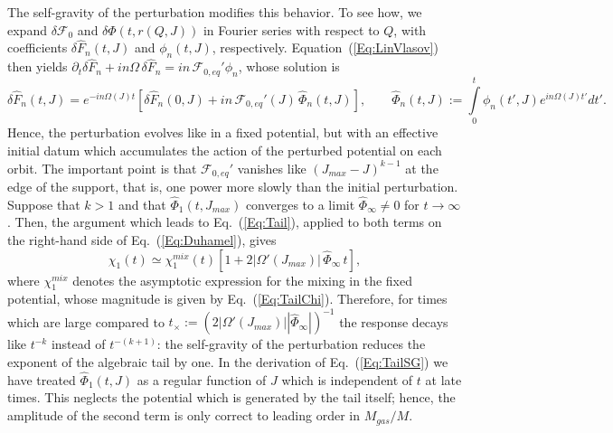 The self-gravity of the perturbation modifies this behavior. To see how, we expand $\delta\mathcal{F}_0$ and $\delta\Phi(t,r(Q,J))$ in Fourier series with respect to $Q$, with coefficients $\delta\hat{F}_n(t,J)$ and $\phi_n(t,J)$, respectively. Equation~(\ref{Eq:LinVlasov}) then yields $\partial_t\delta\hat{F}_n + in\Omega\,\delta\hat{F}_n = in\,\mathcal{F}_{0,eq}'\phi_n$, whose solution is
\begin{equation}
\delta\hat{F}_n(t,J) = e^{-in\Omega(J)t}\left[ \delta\hat{F}_n(0,J) + in\,\mathcal{F}_{0,eq}'(J)\,\hat{\Phi}_n(t,J) \right],\qquad
\hat{\Phi}_n(t,J) := \int\limits_0^t \phi_n(t',J) e^{in\Omega(J)t'} dt'.
\label{Eq:Duhamel}
\end{equation}
Hence, the perturbation evolves like in a fixed potential, but with an effective initial datum which accumulates the action of the perturbed potential on each orbit. The important point is that $\mathcal{F}_{0,eq}'$ vanishes like $(J_{max} - J)^{k-1}$ at the edge of the support, that is, one power more slowly than the initial perturbation. Suppose that $k > 1$ and that $\hat{\Phi}_1(t,J_{max})$ converges to a limit $\hat{\Phi}_\infty\neq 0$ for $t\to \infty$. Then, the argument which leads to Eq.~(\ref{Eq:Tail}), applied to both terms on the right-hand side of Eq.~(\ref{Eq:Duhamel}), gives
\begin{equation}
\chi_1(t)\simeq \chi_1^{mix}(t)\left[ 1 + 2|\Omega'(J_{max})|\,\hat{\Phi}_\infty\, t \right],
\label{Eq:TailSG}
\end{equation}
where $\chi_1^{mix}$ denotes the asymptotic expression for the mixing in the fixed potential, whose magnitude is given by Eq.~(\ref{Eq:TailChi}). Therefore, for times which are large compared to $t_\times := (2|\Omega'(J_{max})||\hat{\Phi}_\infty|)^{-1}$ the response decays like $t^{-k}$ instead of $t^{-(k+1)}$: the self-gravity of the perturbation reduces the exponent of the algebraic tail by one. In the derivation of Eq.~(\ref{Eq:TailSG}) we have treated $\hat{\Phi}_1(t,J)$ as a regular function of $J$ which is independent of $t$ at late times. This neglects the potential which is generated by the tail itself; hence, the amplitude of the second term is only correct to leading order in $M_{gas}/M$.

